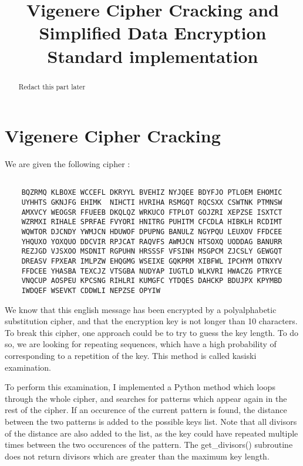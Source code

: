 \documentclass{article}
\title{\textbf{Vigenere Cipher Cracking and Simplified Data Encryption Standard implementation}}
\author{}
\date{}
\begin{document}
\maketitle \thispagestyle{fancy}

\begin{abstract}
    Redact this part later
    
\end{abstract}

\section{Vigenere Cipher Cracking}

We are given the following cipher :

\begin{verbatim}

    BQZRMQ KLBOXE WCCEFL DKRYYL BVEHIZ NYJQEE BDYFJO PTLOEM EHOMIC
    UYHHTS GKNJFG EHIMK  NIHCTI HVRIHA RSMGQT RQCSXX CSWTNK PTMNSW
    AMXVCY WEOGSR FFUEEB DKQLQZ WRKUCO FTPLOT GOJZRI XEPZSE ISXTCT
    WZRMXI RIHALE SPRFAE FVYORI HNITRG PUHITM CFCDLA HIBKLH RCDIMT
    WQWTOR DJCNDY YWMJCN HDUWOF DPUPNG BANULZ NGYPQU LEUXOV FFDCEE
    YHQUXO YOXQUO DDCVIR RPJCAT RAQVFS AWMJCN HTSOXQ UODDAG BANURR
    REZJGD VJSXOO MSDNIT RGPUHN HRSSSF VFSINH MSGPCM ZJCSLY GEWGQT
    DREASV FPXEAR IMLPZW EHQGMG WSEIXE GQKPRM XIBFWL IPCHYM OTNXYV
    FFDCEE YHASBA TEXCJZ VTSGBA NUDYAP IUGTLD WLKVRI HWACZG PTRYCE
    VNQCUP AOSPEU KPCSNG RIHLRI KUMGFC YTDQES DAHCKP BDUJPX KPYMBD
    IWDQEF WSEVKT CDDWLI NEPZSE OPYIW

\end{verbatim}

We know that this english message has been encrypted by a polyalphabetic substitution cipher, and that the encryption key is not longer than 10 characters. To break this cipher, one approach could be to try to guess the key length. To do so, we are looking for repeating sequences, which have a high probability of corresponding to a repetition of the key. This method is called kasiski examination.\cite{vigenere}

To perform this examination, I implemented a Python method which loops through the whole cipher, and searches for patterns which appear again in the rest of the cipher. If an occurence of the current pattern is found, the distance between the two patterns is added to the possible keys list. Note that all divisors of the distance are also added to the list, as the key could have repeated multiple times between the two occurences of the pattern. The get\_divisors() subroutine does not return divisors which are greater than the maximum key length.
\bigskip
\end{document}
